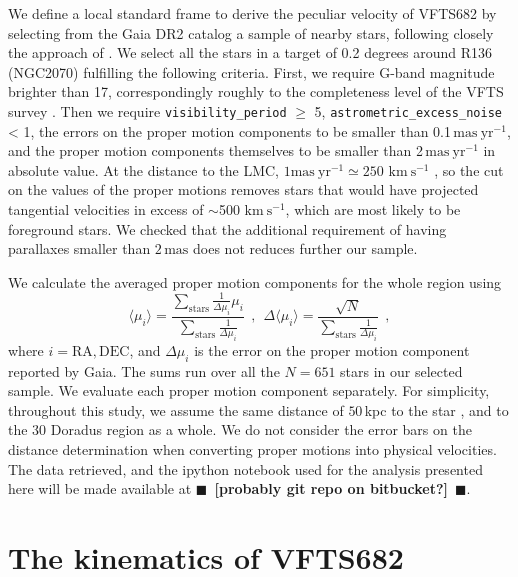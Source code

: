 \documentclass[apjl,twocolumn]{emulateapj}
\newcommand{\todo}[1]{{\large $\blacksquare$~\textbf{\color{red}[#1]}}~$\blacksquare$}
\newcommand{\SdM}[1]{{{\color{Wildstrawberry}{#1}}}}
\newcommand{\kms}{{\,\mathrm{km\ s^{-1}}}}
\begin{document}
We define a local standard frame \SdM{of reference} to derive the peculiar velocity
of VFTS682 by selecting from the Gaia DR2 catalog a sample of nearby
stars, following closely the approach of \cite{lennon:18}.
We select all the stars in a target of 0.2 degrees around R136
(NGC2070) fulfilling the following criteria. First, we require G-band
magnitude brighter than 17, correspondingly roughly to the
completeness level of the VFTS survey \citep[here we implicitly assume
G$\sim$V,][]{evans:11}. Then we require \texttt{visibility\_period} $\geq$ 5,
\texttt{astrometric\_excess\_noise} < 1, the errors on the proper
motion components to be smaller than 0.1\,$\mathrm{mas\ yr^{-1}}$,
and the proper motion components themselves to be smaller than
2\,$\mathrm{mas\ yr^{-1}}$ in absolute value. At the distance to the
LMC, $1\mathrm{mas\ yr^{-1}}\simeq250\,\kms$ \citep[e.g.,][]{lennon:18}, so the cut on the values
of the proper motions removes stars that would have projected
tangential velocities in excess of $\sim$500\,$\kms$, which are most
likely to be foreground stars. We checked that the additional
requirement of having parallaxes smaller than $2\,\mathrm{mas}$ does
not reduces further our sample. 

We calculate the averaged proper motion components for the whole
region using 
\begin{equation}
  \label{eq:mean}
  \langle \mu_i\rangle = \frac{\sum_\mathrm{stars}\frac{1}{\Delta
      \mu_i}\mu_i}{\sum_\mathrm{stars} \frac{1}{\Delta \mu_i}} \ \ , \
  \ \Delta \langle \mu_i\rangle = \frac{\sqrt{N}}{\sum_\mathrm{stars}
    \frac{1}{\Delta \mu_i}} \ \ ,
\end{equation}
where $i = \mathrm{RA}, \mathrm{DEC}$, and $\Delta \mu_i$ is the error
on the proper motion component reported by Gaia. The sums run over
all the $N=651$ stars in our selected sample. We evaluate each proper motion
component separately. For simplicity, throughout this study, we assume the same
distance of $50$\,kpc to the star \citep[][]{lebouteiller:08}, and to
the 30 Doradus region as a whole. We do not consider the error bars on
the distance determination when converting proper motions into
physical velocities. The data retrieved, and the ipython notebook used for the analysis
presented here will be made available at \todo{probably git repo on bitbucket?}. 

\section{The kinematics of VFTS682}
\label{sec:results}
\end{document}
